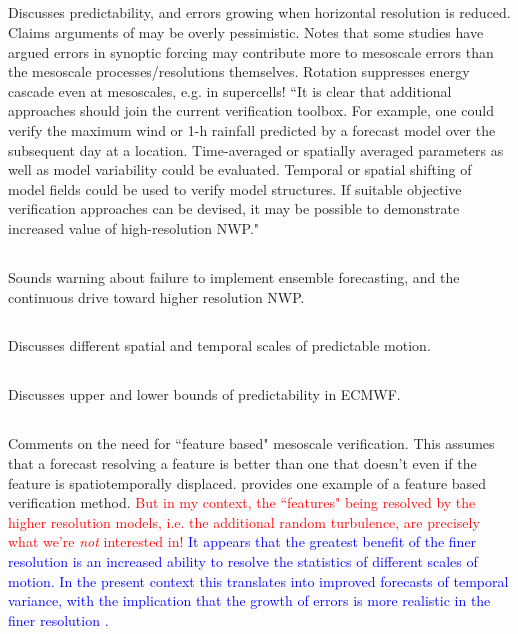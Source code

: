 \documentclass{article}
\begin{document}
\subsection{\citet{mass02}}
Discusses predictability, and errors growing when horizontal resolution is reduced. Claims arguments of \citet{lorenz69} may be overly pessimistic. Notes that some studies have argued errors in synoptic forcing may contribute more to mesoscale errors than the mesoscale processes/resolutions themselves. Rotation suppresses energy cascade even at mesoscales, e.g. in supercells! ``It is clear that additional approaches should join the current verification toolbox. For example, one could verify the maximum wind or 1-h rainfall predicted by a forecast model over the subsequent day at a location. Time-averaged or spatially averaged parameters as well as model variability could be evaluated. Temporal or spatial shifting of model fields could be used to verify model structures. If suitable objective verification approaches can be devised, it may be possible to demonstrate increased value of high-resolution NWP."

\subsection{\citet{brooks93}}
Sounds warning about failure to implement ensemble forecasting, and the continuous drive toward higher resolution NWP. 

\subsection{\citet{lorenz69}}
Discusses different spatial and temporal scales of predictable motion.   

\subsection{\citet{lorenz82}}
Discusses upper and lower bounds of predictability in ECMWF.

\subsection{\citet{rife05}}
Comments on the need for ``feature based" mesoscale verification. This assumes that a forecast resolving a feature is better than one that doesn't even if the feature is spatiotemporally displaced. \citet{ebert00} provides one example of a feature based verification method. \textcolor{red}{But in my context, the ``features" being resolved by the higher resolution models, i.e. the additional random turbulence, are precisely what we're \textit{not} interested in!} \textcolor{blue}{It appears that the greatest benefit of the finer resolution is an increased ability to resolve the statistics of different scales of motion. In the present context this translates into improved forecasts of temporal variance, with the implication that the growth of errors is more realistic in the finer resolution \citep{rife05}.}
\end{document}
